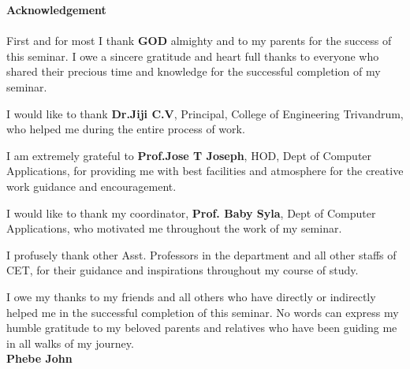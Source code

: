 \begin{titlepage}
\begin{center}
\textbf{\LARGE{Acknowledgement}}\\[0.5cm] 
\end{center}
\paragraph{}
First and for most I thank \textbf{GOD} almighty and to my parents for the success of this seminar. I owe a sincere gratitude and heart full thanks to everyone who shared their precious time and knowledge for the successful completion of my seminar.

I would like to thank \textbf{Dr.Jiji C.V}, Principal,  College of Engineering Trivandrum, who helped me during the entire process of work.

I am extremely grateful to \textbf{Prof.Jose T Joseph}, HOD, Dept of Computer Applications, for providing me with best facilities and atmosphere for the creative work guidance and encouragement.

I would like to thank my coordinator,\textbf{ Prof. Baby Syla}, Dept of Computer Applications, who motivated me throughout the work of my seminar.  

I profusely thank other Asst. Professors in the department and all other staffs of CET, for their guidance and inspirations throughout my course of study.

I owe my thanks to my friends and all others who have directly or indirectly helped me in the successful completion of this seminar. No words can express my humble gratitude to my beloved parents and relatives who have been guiding me in all walks of my journey.\\

 \vspace{1.1cm}
\hspace{345pt} \textbf{Phebe John}


\end{titlepage}
